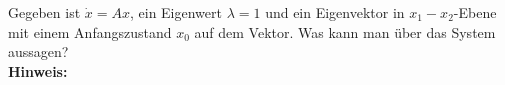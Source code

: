 \begin{question}[section=2,name={Anfangszustand},difficulty=3,type=mdl,tags={}]
	Gegeben ist $\dot{x} = Ax$, ein Eigenwert $\lambda = 1$ und ein Eigenvektor in $x_1-x_2$-Ebene mit einem Anfangszustand $x_0$ auf dem Vektor. Was kann man über das System aussagen?
	\\ \textbf{Hinweis:}\\
	
\end{question}
\begin{solution}
	
\end{solution}